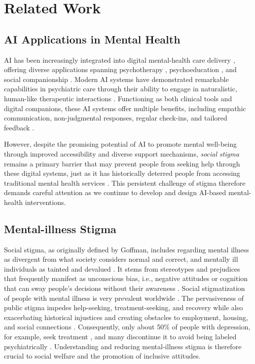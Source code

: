 \section{Related Work}

\subsection{AI Applications in Mental Health}

AI has been increasingly integrated into digital mental-health care delivery \cite{ai_mh_ma_2023, ai_mh_ma_2024}, offering diverse applications spanning psychotherapy \cite{therapy_ai_prochaska_2021}, psychoeducation \cite{ai_psychoedu_jang_2021}, and social companionship \cite{ai_mh_ma_2023}.
Modern AI systems have demonstrated remarkable capabilities in psychiatric care through their ability to engage in naturalistic, human-like therapeutic interactions \cite{ai_mh_jo_2023}.
Functioning as both clinical tools and digital companions, these AI systems offer multiple benefits, including empathic communication, non-judgmental responses, regular check-ins, and tailored feedback \cite{ai_mh_li_2023}.

However, despite the promising potential of AI to promote mental well-being through improved accessibility and diverse support mechanisms, \textit{social stigma} remains a primary barrier that may prevent people from seeking help through these digital systems, just as it has historically deterred people from accessing traditional mental health services \cite{ai_mh_hoffman_2024}.
This persistent challenge of stigma therefore demands careful attention as we continue to develop and design AI-based mental-health interventions.



\subsection{Mental-illness Stigma}

Social stigma, as originally defined by Goffman, includes regarding mental illness as divergent from what society considers normal and correct, and mentally ill individuals as tainted and devalued \cite{stigma_spoiled_identity_goffman_1964}. 
It stems from stereotypes and prejudices \cite{attribution_model_corrigan_2003} that frequently manifest as unconscious bias, i.e., negative attitudes or cognition that can sway people's decisions without their awareness \cite{microaggression_stigma_gonzales_2015}. 
Social stigmatization of people with mental illness is very prevalent worldwide \cite{measuing_stigma_corrigan_2010}. 
The pervasiveness of public stigma impedes help-seeking, treatment-seeking, and recovery while also exacerbating historical injustices \cite{decolonial_pendse_2022} and creating obstacles to employment, housing, and social connections \cite{understanding_corrigan_2002}. 
Consequently, only about 50\% of people with depression, for example, seek treatment \cite{depression_ratio_kessler_2003}, and many discontinue it to avoid being labeled psychiatrically \cite{depression_seeking_dew_1988}. 
Understanding and reducing mental-illness stigma is therefore crucial to social welfare and the promotion of inclusive attitudes.


